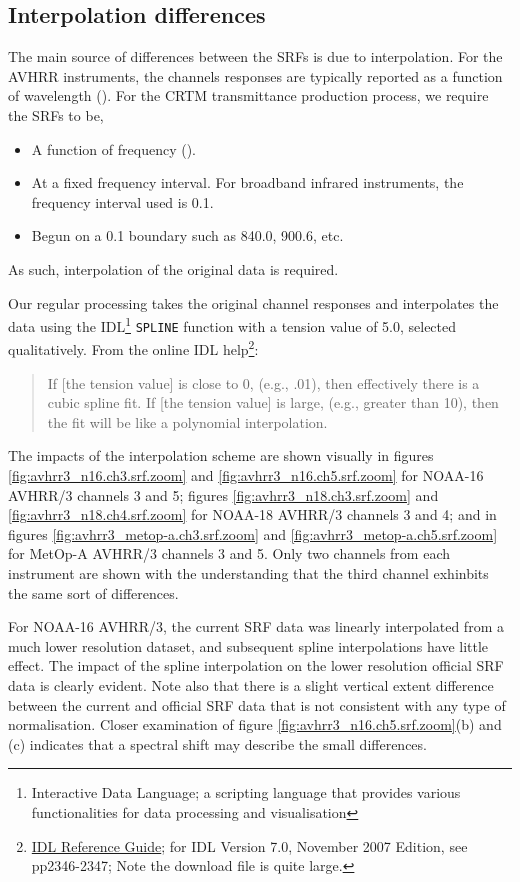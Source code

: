 \subsection{Interpolation differences}
The main source of differences between the SRFs is due to interpolation. For the AVHRR instruments, the channels responses are typically reported as a function of wavelength (\micron). For the CRTM transmittance production process, we require the SRFs to be,
\begin{itemize}
  \item A function of frequency (\invcm).
  \item At a fixed frequency interval. For broadband infrared instruments, the frequency interval used is 0.1\invcm.
  \item Begun on a 0.1\invcm{} boundary such as 840.0, 900.6, etc.
\end{itemize}
As such, interpolation of the original data is required.

Our regular processing takes the original channel responses and interpolates the data using the IDL\footnote{Interactive Data Language; a scripting language that provides various functionalities for data processing and visualisation} \texttt{SPLINE} function with a tension value of 5.0, selected qualitatively. From the online IDL help\footnote{\href{http://www.ittvis.com/portals/0/pdfs/idl/refguide.pdf}{IDL Reference Guide}; for IDL Version 7.0, November 2007 Edition, see pp2346-2347; Note the download file is quite large.}:

\begin{quote}
If [the tension value] is close to 0, (e.g., .01), then effectively there is a cubic spline fit. If [the tension value] is large, (e.g., greater than 10), then the fit will be like a polynomial interpolation.
\end{quote}

The impacts of the interpolation scheme are shown visually in figures \ref{fig:avhrr3_n16.ch3.srf.zoom} and \ref{fig:avhrr3_n16.ch5.srf.zoom} for NOAA-16 AVHRR/3 channels 3 and 5; figures \ref{fig:avhrr3_n18.ch3.srf.zoom} and \ref{fig:avhrr3_n18.ch4.srf.zoom} for NOAA-18 AVHRR/3 channels 3 and 4; and in figures \ref{fig:avhrr3_metop-a.ch3.srf.zoom} and \ref{fig:avhrr3_metop-a.ch5.srf.zoom} for MetOp-A AVHRR/3 channels 3 and 5. Only two channels from each instrument are shown with the understanding that the third channel exhinbits the same sort of differences.

For NOAA-16 AVHRR/3, the current SRF data was linearly interpolated from a much lower resolution dataset, and subsequent spline interpolations have little effect. The impact of the spline interpolation on the lower resolution official SRF data is clearly evident. Note also that there is a slight vertical extent difference between the current and official SRF data that is not consistent with any type of normalisation. Closer examination of figure \ref{fig:avhrr3_n16.ch5.srf.zoom}(b) and (c) indicates that a spectral shift may describe the small differences.

